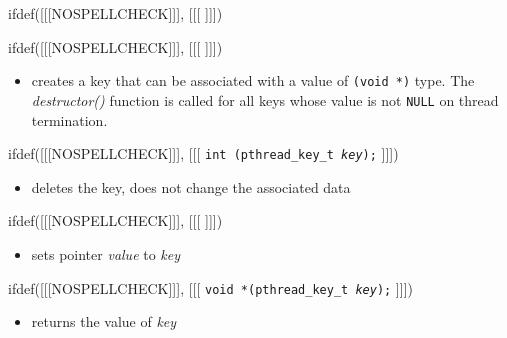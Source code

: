 
ifdef([[[NOSPELLCHECK]]], [[[
]]])

\begin{slide}
ifdef([[[NOSPELLCHECK]]], [[[
]]])
\begin{itemize}
\item creates a key that can be associated with a value of
\texttt{(void *)} type. The \emph{destructor()} function is called for all keys
whose value is not \texttt{NULL} on thread termination.
\end{itemize}
ifdef([[[NOSPELLCHECK]]], [[[
\texttt{int (pthread\_key\_t \emph{key});}
]]])
\begin{itemize}
\item deletes the key, does not change the associated data
\end{itemize}
ifdef([[[NOSPELLCHECK]]], [[[
]]])
\begin{itemize}
\item sets pointer \emph{value} to \emph{key}
\end{itemize}
ifdef([[[NOSPELLCHECK]]], [[[
\texttt{void *(pthread\_key\_t \emph{key});}
]]])
\begin{itemize}
\item returns the value of \emph{key}
\end{itemize}
\end{slide}

